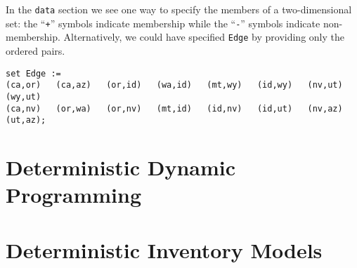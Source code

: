In the \texttt{data} section we see one way to specify the members of a 
two-dimensional set: the ``\texttt{+}'' symbols indicate membership while the
``\texttt{-}'' symbols indicate non-membership. Alternatively, we could have
specified \texttt{Edge} by providing only the ordered pairs.
\begin{Verbatim}[samepage=true]
set Edge :=
(ca,or)   (ca,az)   (or,id)   (wa,id)   (mt,wy)   (id,wy)   (nv,ut)   (wy,ut)
(ca,nv)   (or,wa)   (or,nv)   (mt,id)   (id,nv)   (id,ut)   (nv,az)   (ut,az);
\end{Verbatim}

\section{Deterministic Dynamic Programming}

\section{Deterministic Inventory Models}

\clearpage
